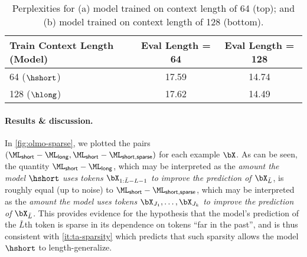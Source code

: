 \begin{table}
\centering
\begin{tabular}{@{}lcc@{}}
\toprule
\textbf{Train Context Length (Model)} & \textbf{Eval Length = 64} & \textbf{Eval Length = 128} \\ \midrule
64 ($\hshort$)                      & 17.59                          & 14.74                            \\
128    ($\hlong$)                  & 17.62                          & 14.49                            \\ \bottomrule
\end{tabular}
\caption{Perplexities for (a) model trained on context length of 64 (top); and (b) model trained on context length of 128 (bottom).}
\label{tab:training-ppl}
\end{table}
  


\paragraph{Results \& discussion.}  In \cref{fig:olmo-sparse}, we plotted the pairs $(\ML_{\mathsf{short}} - \ML_{\mathsf{long}}, \ML_{\mathsf{short}} - \ML_{\mathsf{short,sparse}})$ for each example $\bX$. %
As can be seen, the quantity $\ML_{\mathsf{short}} - \ML_{\mathsf{long}}$, which may be interpreted as the \emph{amount the model $\hshort$ uses tokens $\bX_{1:\bar L - L - 1}$ to improve the prediction of $\bX_{\bar L}$}, is roughly equal (up to noise) to $\ML_{\mathsf{short}} - \ML_{\mathsf{short,sparse}}$, which may be interpreted as the \emph{amount the model uses tokens $\bX_{J_1}, \ldots, \bX_{J_k}$ to improve the prediction of $\bX_{\bar L}$}. This provides evidence for the hypothesis that the model's prediction of the $\bar L$th token is sparse in its dependence on tokens ``far in the past'', and is thus consistent with \ref{it:ta-sparsity} which predicts that such sparsity allows the model $\hshort$ to length-generalize. %




